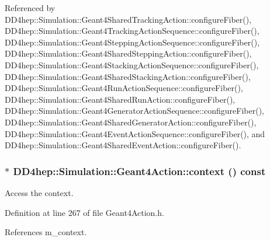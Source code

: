 Referenced by DD4hep::Simulation::Geant4SharedTrackingAction::configureFiber(), DD4hep::Simulation::Geant4TrackingActionSequence::configureFiber(), DD4hep::Simulation::Geant4SteppingActionSequence::configureFiber(), DD4hep::Simulation::Geant4SharedSteppingAction::configureFiber(), DD4hep::Simulation::Geant4StackingActionSequence::configureFiber(), DD4hep::Simulation::Geant4SharedStackingAction::configureFiber(), DD4hep::Simulation::Geant4RunActionSequence::configureFiber(), DD4hep::Simulation::Geant4SharedRunAction::configureFiber(), DD4hep::Simulation::Geant4GeneratorActionSequence::configureFiber(), DD4hep::Simulation::Geant4SharedGeneratorAction::configureFiber(), DD4hep::Simulation::Geant4EventActionSequence::configureFiber(), and DD4hep::Simulation::Geant4SharedEventAction::configureFiber().\hypertarget{class_d_d4hep_1_1_simulation_1_1_geant4_action_ae695d6fe735edceeea30e84afd329e38}{
\subsubsection[{context}]{$\ast$ DD4hep::Simulation::Geant4Action::context () const}}
\label{class_d_d4hep_1_1_simulation_1_1_geant4_action_ae695d6fe735edceeea30e84afd329e38}


Access the context. 

Definition at line 267 of file Geant4Action.h.

References m\_\-context.

